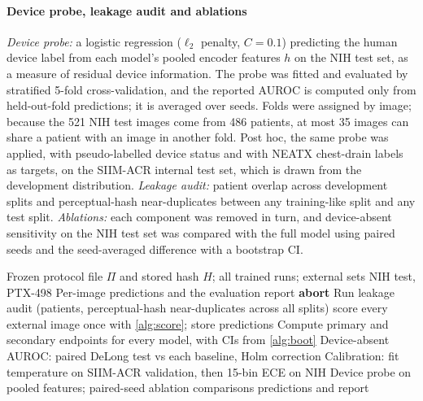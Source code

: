 \documentclass{ieeeaccess}
\begin{document}
\paragraph{Device probe, leakage audit and ablations}
\emph{Device probe:} a logistic regression ($\ell_2$ penalty, $C=0.1$) predicting the human device label from each model's pooled encoder features $h$ on the NIH test set, as a measure of residual device information. The probe was fitted and evaluated by stratified 5-fold cross-validation, and the reported AUROC is computed only from held-out-fold predictions; it is averaged over seeds. Folds were assigned by image; because the 521 NIH test images come from 486 patients, at most 35 images can share a patient with an image in another fold. Post hoc, the same probe was applied, with pseudo-labelled device status and with NEATX chest-drain labels as targets, on the SIIM-ACR internal test set, which is drawn from the development distribution. \emph{Leakage audit:} patient overlap across development splits and perceptual-hash near-duplicates between any training-like split and any test split. \emph{Ablations:} each component was removed in turn, and device-absent sensitivity on the NIH test set was compared with the full model using paired seeds and the seed-averaged difference with a bootstrap CI.

\begin{algorithm}[!t]
\caption{Single external evaluation (stage \emph{planb\_gate2})}
\label{alg:eval}
\begin{algorithmic}[1]
\Require Frozen protocol file $\Pi$ and stored hash $H$; all trained runs; external sets NIH test, PTX-498
\Ensure Per-image predictions and the evaluation report
 \State \textbf{abort}  \label{line:hash}
\EndIf
\State Run leakage audit (patients, perceptual-hash near-duplicates across all splits)
 \State score every external image once with \cref{alg:score}; store predictions
\EndFor
\State Compute primary and secondary endpoints for every model, with CIs from \cref{alg:boot}
\State Device-absent AUROC: paired DeLong test vs each baseline, Holm correction
\State Calibration: fit temperature on SIIM-ACR validation, then 15-bin ECE on NIH
\State Device probe on pooled features; paired-seed ablation comparisons
\State \Return predictions and report
\end{algorithmic}
\end{algorithm}
\end{document}
